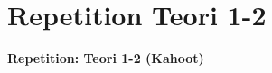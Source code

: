 \section{Repetition Teori 1-2}

\begin{frame}
  \vspace{3em}
  \begin{center}
    {\LARGE \textbf{Repetition: Teori 1-2 (Kahoot)}}
  \end{center}
\end{frame}